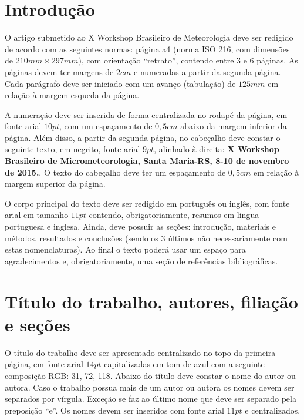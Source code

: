 \documentclass[]{workmicro2019} %
\affil[1]{Curso de Graduação em Meteorologia, UFPEL}
\affil[2]{Curso de Graduação em Meteorologia, UFSC}
\affil[3]{Curso Técnico em Meteorologia, IFSC}
\affil[4]{Departamento de Física, UFSM}
\begin{document}

\corpo  %


\section{Introdução}

\par O artigo submetido ao X Workshop Brasileiro de Meteorologia deve ser redigido de acordo com as seguintes normas: página a4 (norma ISO 216, com dimensões de $210mm\times297mm$), com orientação ``retrato'', contendo entre 3 e 6 páginas. As páginas devem ter margens de $2cm$ e numeradas a partir da segunda página. Cada parágrafo deve ser iniciado com um avanço (tabulação) de $125mm$ em relação à margem esqueda da página.

\par A numeração deve ser inserida de forma centralizada no rodapé da página, em fonte arial $10pt$, com um espaçamento de $0,5cm$ abaixo da margem inferior da página. Além disso, a partir da segunda página, no cabeçalho deve constar o seguinte texto, em negrito, fonte arial $9pt$, alinhado à direita: \textbf{X Workshop Brasileiro de Micrometeorologia, Santa Maria-RS, 8-10 de novembro de 2015.}. O texto do cabeçalho deve ter um espaçamento de $0,5cm$ em relação à margem superior da página.

\par O corpo principal do texto deve ser redigido em português ou inglês, com fonte arial em tamanho $11pt$ contendo, obrigatoriamente, resumos em lingua portuguesa e inglesa. Ainda, deve possuir as seções: introdução, materiais e métodos, resultados e conclusões (sendo os 3 últimos não necessariamente com estas nomenclaturas). Ao final o texto poderá usar um espaço para agradecimentos e, obrigatoriamente, uma seção de referências bibliográficas.



\section{Título do trabalho, autores, filiação e seções}

\par O título do trabalho deve ser apresentado centralizado no topo da primeira página, em fonte arial $14pt$ capitalizadas em tom de azul com a seguinte composição RGB: 31, 72, 118. Abaixo do título deve constar o nome do autor ou autora. Caso o trabalho possua mais de um autor ou autora os nomes devem ser separados por vírgula. Exceção se faz ao último nome que deve ser separado pela preposição ``e''. Os nomes devem ser inseridos com fonte arial $11pt$ e centralizados.
\end{document}
